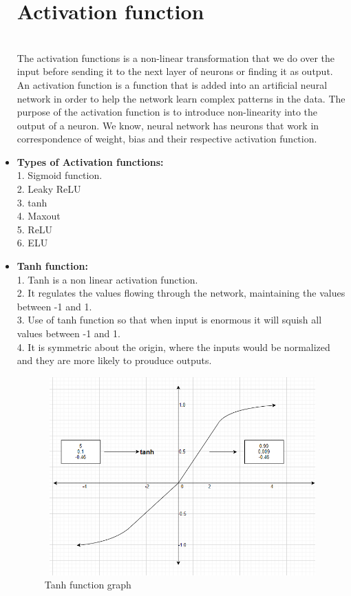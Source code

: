 \documentclass[openany,12pt]{report}
\begin{document}
\begin{itemize}
\section{Activation function}\\
The activation functions is a non-linear transformation that we do over the input before sending it to the next layer of neurons or finding it as output.
\\
An activation function is a function that is added into an artificial neural network in order to help the network learn complex patterns in the data. 
The purpose of the activation function is to introduce non-linearity into the output of a neuron. We know, neural network has neurons that work in correspondence of weight, bias and their respective activation function.
\\
\item{\textbf{Types of Activation functions:}}\\
1. Sigmoid function.\\
2. Leaky ReLU\\
3. tanh\\
4. Maxout\\
5. ReLU\\
6. ELU\\
\item{\textbf{Tanh function:}}\\
1. Tanh is a non linear activation function.\\
2. It regulates the      values flowing through the network, maintaining the values between -1 and 1.\\
3. Use of tanh function so that when input is enormous it will squish all values between -1 and 1.\\
4. It is symmetric about the origin, where the inputs would be normalized and they are more likely to prouduce outputs.\\

\begin{figure}[H]
\centering
\includegraphics[width=5in,height=3in]{./Tanh.png}
\caption{Tanh function graph}
\end{figure}


\end{itemize}
\end{document}

